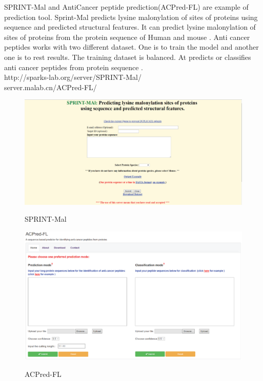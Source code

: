 SPRINT-Mal and AntiCancer peptide prediction(ACPred-FL) are example of prediction tool. Sprint-Mal predicts lysine malonylation of sites of proteins using sequence and predicted structural features. It can predict lysine malonylation of sites of proteins from the protein sequence of Human and mouse \citep{Anderson04}. Anti cancer peptides works with two different dataset. One is to train the model and another one is to rest results. The training dataset is balanced. At predicts or classifies anti cancer peptides from protein sequence \citep{Anderson05}.\\
http://sparks-lab.org/server/SPRINT-Mal/  \\
server.malab.cn/ACPred-FL/ 

\begin{figure}[H]
  \centering
  \begin{minipage}[b]{0.4\textwidth}
    \includegraphics[width=\textwidth]{spintmal.eps}
    \caption{SPRINT-Mal}\centering \cite{Anderson04}
  \end{minipage}
  \hfill
  \begin{minipage}[b]{0.4\textwidth}
    \includegraphics[width=\textwidth]{Anticancer.eps}
    \caption{ACPred-FL} \centering \cite{Anderson05}
  \end{minipage}
\end{figure}

